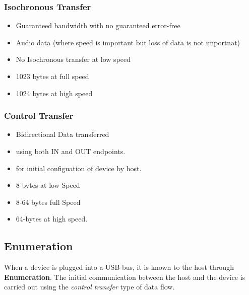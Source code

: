 \documentclass{article}
\begin{document}
\subsubsection{Isochronous Transfer}
\begin{itemize}
    \item Guaranteed bandwidth with no guaranteed error-free
    \item Audio data (where speed is important but loss of data is not importnat)
    \item No Isochronous transfer at low speed
    \item 1023 bytes at full speed
    \item 1024 bytes at high speed
\end{itemize}

\subsubsection{Control Transfer}
\begin{itemize}
    \item Bidirectional Data transferred
    \item using both IN and OUT endpoints.
    \item for initial configuation of device by host.
    \item 8-bytes at low Speed
    \item 8-64 bytes full Speed
    \item 64-bytes at high speed.
\end{itemize}

\subsection{Enumeration}
When a device is plugged into a USB bus, it is known to the host through \textbf{Enumeration}.
The initial communication between the host and the device is carried out using the \emph{control transfer} type of data flow.
\end{document}
